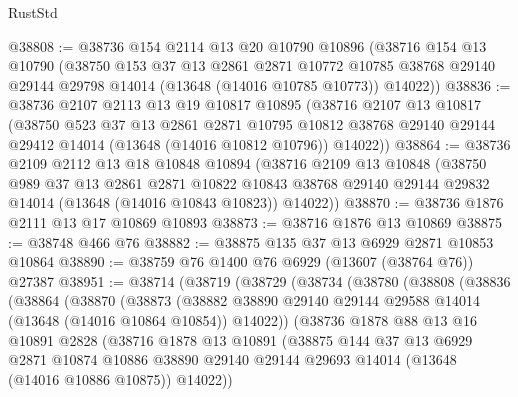 \begin{lexlean}{RustStd}
\begin{coremodule}
@38808 := @38736
    @154
    @2114
    @13
    @20
    @10790
    @10896
    (@38716
      @154
      @13
      @10790
      (@38750
        @153
        @37
        @13
        @2861
        @2871
        @10772
        @10785
        @38768
        @29140
        @29144
        @29798
        @14014
        (@13648 (@14016 @10785 @10773))
        @14022))
@38836 := @38736
    @2107
    @2113
    @13
    @19
    @10817
    @10895
    (@38716
      @2107
      @13
      @10817
      (@38750
        @523
        @37
        @13
        @2861
        @2871
        @10795
        @10812
        @38768
        @29140
        @29144
        @29412
        @14014
        (@13648 (@14016 @10812 @10796))
        @14022))
@38864 := @38736
    @2109
    @2112
    @13
    @18
    @10848
    @10894
    (@38716
      @2109
      @13
      @10848
      (@38750
        @989
        @37
        @13
        @2861
        @2871
        @10822
        @10843
        @38768
        @29140
        @29144
        @29832
        @14014
        (@13648 (@14016 @10843 @10823))
        @14022))
@38870 := @38736 @1876 @2111 @13 @17 @10869 @10893
@38873 := @38716 @1876 @13 @10869
@38875 := @38748 @466 @76
@38882 := @38875 @135 @37 @13 @6929 @2871 @10853 @10864
@38890 := @38759 @76 @1400 @76 @6929 (@13607 (@38764 @76)) @27387
@38951 := @38714
    (@38719
      (@38729
        (@38734
          (@38780
            (@38808
              (@38836
                (@38864
                  (@38870
                    (@38873
                      (@38882
                        @38890
                        @29140
                        @29144
                        @29588
                        @14014
                        (@13648 (@14016 @10864 @10854))
                        @14022))
                    (@38736
                      @1878
                      @88
                      @13
                      @16
                      @10891
                      @2828
                      (@38716
                        @1878
                        @13
                        @10891
                        (@38875
                          @144
                          @37
                          @13
                          @6929
                          @2871
                          @10874
                          @10886
                          @38890
                          @29140
                          @29144
                          @29693
                          @14014
                          (@13648 (@14016 @10886 @10875))
                          @14022))

\end{coremodule}
\end{lexlean}
